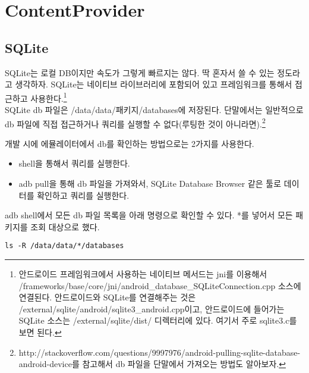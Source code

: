 \chapter{ContentProvider}
\section{SQLite}\label{sec:sqlite}
SQLite는 로컬 DB이지만 속도가 그렇게 빠르지는 않다. 딱 혼자서 쓸 수 있는 정도라고 생각하자.
SQLite는 네이티브 라이브러리에 포함되어 있고 프레임워크를 통해서 접근하고 사용한다.\footnote{안드로이드 프레임워크에서 사용하는 네이티브 메서드는 jni를 이용해서 /frameworks/base/core/jni/android\_database\_SQLiteConnection.cpp 소스에 연결된다.
안드로이드와 SQLite를 연결해주는 것은 /external/sqlite/android/sqlite3\_android.cpp이고,
안드로이드에 들어가는 SQLite 소스는 /external/sqlite/dist/ 디렉터리에 있다. 여기서 주로 sqlite3.c를 보면 된다.}\\

SQLite db 파일은 /data/data/패키지/databases에 저장된다. 
단말에서는 일반적으로 db 파일에 직접 접근하거나 쿼리를 실행할 수 없다(루팅한 것이 아니라면).\footnote{http://stackoverflow.com/questions/9997976/android-pulling-sqlite-database-android-device를 참고해서 db 파일을 단말에서 가져오는 방법도 알아보자.}

개발 시에 에뮬레이터에서 db를 확인하는 방법으로는 2가지를 사용한다.
\begin{itemize}
\item shell을 통해서 쿼리를 실행한다.
\item adb pull을 통해 db 파일을 가져와서, SQLite Database Browser 같은 툴로 데이터를 확인하고 쿼리를 실행한다.
\end{itemize}

adb shell에서 모든 db 파일 목록을 아래 명령으로 확인할 수 있다. *를 넣어서 모든 패키지를 조회 대상으로 했다. 
\begin{lstlisting}[frame=single]
 ls -R /data/data/*/databases 
\end{lstlisting}

